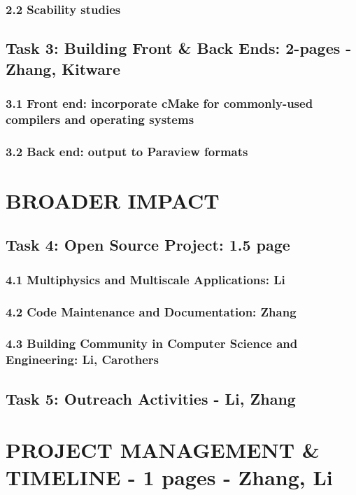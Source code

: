 \documentclass[12pt]{article}
\begin{document}
\subsubsection{2.2 Scability studies}

\subsection{Task 3: Building Front \& Back Ends: 2-pages - Zhang, Kitware}
\subsubsection{3.1 Front end: incorporate cMake for commonly-used compilers and operating systems}
\subsubsection{3.2 Back end: output to Paraview formats}



\section{BROADER IMPACT}

\subsection{Task 4: Open Source Project: 1.5 page}
\subsubsection{4.1 Multiphysics and Multiscale Applications:  Li}
\subsubsection{4.2 Code Maintenance and Documentation:  Zhang}
\subsubsection{4.3 Building Community in Computer Science and Engineering: Li, Carothers}

\subsection{Task 5: Outreach Activities - Li, Zhang}


\vskip0.05in



\section{PROJECT MANAGEMENT \& TIMELINE - 1 pages - Zhang, Li}
\end{document}
